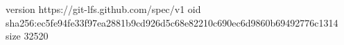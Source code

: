 version https://git-lfs.github.com/spec/v1
oid sha256:ec5fe94fe33f97ea2881b9cd926d5c68e82210c690ec6d9860b69492776c1314
size 32520
